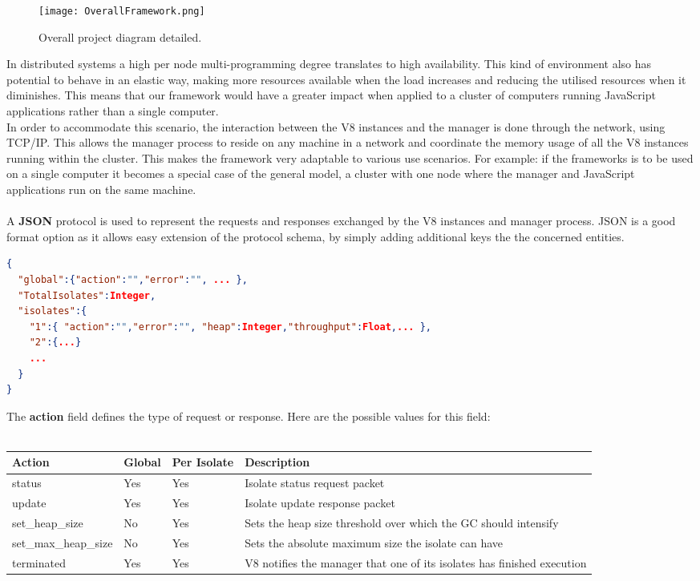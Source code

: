 \documentclass{l4proj}
\begin{document}
\begin{figure}[!ht]
  \centering
    \texttt{[image: OverallFramework.png]}
  \caption{Overall project diagram detailed.}
\end{figure}
\hspace*{3em} In distributed systems a high per node multi-programming degree translates to high availability. This kind of environment also has potential to behave in an elastic way, making more resources available when the load increases and reducing the utilised resources when it diminishes. This means that our framework would have a greater impact when applied to a cluster of computers running JavaScript applications rather than a single computer.\\
\hspace*{3em} In order to accommodate this scenario, the interaction between the V8 instances and the manager is done through the network, using TCP/IP. This allows the manager process to reside on any machine in a network and coordinate the memory usage of all the V8 instances running within the cluster. This makes the framework very adaptable to various use scenarios. For example: if the frameworks is to be used on a single computer it becomes a special case of the general model, a cluster with one node where the manager and JavaScript applications run on the same machine.
\\\\
\hspace*{3em} A \textbf{JSON} protocol is used to represent the requests and responses exchanged by the V8 instances and manager process. JSON is a good format option as it allows easy extension of the protocol schema, by simply adding additional keys the the concerned entities.
\begin{lstlisting}[language=json,firstnumber=1]
{
  "global":{"action":"","error":"", ... },
  "TotalIsolates":Integer,
  "isolates":{
    "1":{ "action":"","error":"", "heap":Integer,"throughput":Float,... },
    "2":{...}
    ...
  }
}
\end{lstlisting}
The \textbf{action} field defines the type of request or response. Here are the possible values for this field:\\\\
\begin{tabular}{  l  l  l  l  }
  Action & Global & Per Isolate & Description \\
\hline
  status & Yes & Yes & Isolate status request packet\\
  update & Yes & Yes & Isolate update response packet\\
  set\_heap\_size & No & Yes & Sets the heap size threshold over which the GC should intensify\\
  set\_max\_heap\_size & No & Yes & Sets the absolute maximum size the isolate can have\\
  terminated & Yes & Yes & V8 notifies the manager that one of its isolates has finished execution\\
\hline
\end{tabular}
\end{document}
